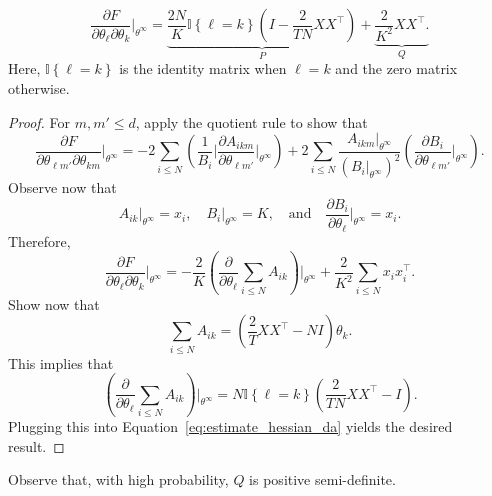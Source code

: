 \begin{lemma}
\begin{equation}
\frac{\partial F}{\partial \theta_\ell \partial \theta_k}\Bigr|_{\theta^\infty} = \underbrace{\frac{2N}{K}\mathbb{I}\left\{\ell = k\right\}\left(I - \frac{2}{TN}XX^\top\right)}_{P} + \underbrace{\frac{2}{K^2}XX^\top.}_Q
\end{equation}
Here, $\mathbb{I}\left\{\ell = k\right\}$ is the identity matrix when $\ell = k$ and the zero matrix otherwise.
\end{lemma}

\begin{proof}
For $m, m' \leq d$, apply the quotient rule to show that
%
\begin{equation}
\frac{\partial F}{\partial \theta_{\ell m'} \partial \theta_{k m}}\Bigr|_{\theta^\infty}
=
-2\sum_{i \leq N}\left(\frac{1}{B_i}\Bigr|\frac{\partial A_{ikm}}{\partial \theta_{\ell m'}}\Bigr|_{\theta^\infty}\right) + 2 \sum_{i \leq N} \frac{A_{ikm}\Bigr|_{\theta^\infty}}{\left(B_i \Bigr|_{\theta^\infty}\right)^2}\left(\frac{\partial B_i}{\partial \theta_{\ell m'}}\Bigr|_{\theta^\infty}\right).
\end{equation}
%
Observe now that
%
\begin{equation}
A_{ik}\Bigr|_{\theta^\infty} = x_i, \quad B_i \Bigr|_{\theta^\infty} = K, \quad \text{and} \quad \frac{\partial B_i}{\partial \theta_\ell}\Bigr|_{\theta^\infty} = x_i.
\end{equation}
%
Therefore,
%
\begin{equation}
\frac{\partial F}{\partial \theta_{\ell} \partial \theta_{k}}\Bigr|_{\theta^\infty}
= - \frac{2}{K}\left(\frac{\partial}{\partial \theta_\ell}\sum_{i \leq N}A_{ik}\right)\Bigr|_{\theta^\infty} + \frac{2}{K^2}\sum_{i \leq N}x_i x_i^\top.
\label{eq:estimate_hessian_da}
\end{equation}
%
Show now that
%
\begin{equation}
\sum_{i \leq N}A_{ik} = \left(\frac{2}{T}XX^\top - NI\right)\theta_k.
\end{equation}
%
This implies that
%
\begin{equation}
\left(\frac{\partial}{\partial \theta_\ell}\sum_{i \leq N}A_{ik}\right)\Bigr|_{\theta^\infty} = N\mathbb{I}\left\{\ell = k\right\}\left(\frac{2}{TN}XX^\top - I\right).
\end{equation}
%
Plugging this into Equation~\ref{eq:estimate_hessian_da} yields the desired result.
\end{proof}

Observe that, with high probability, $Q$ is positive semi-definite.

